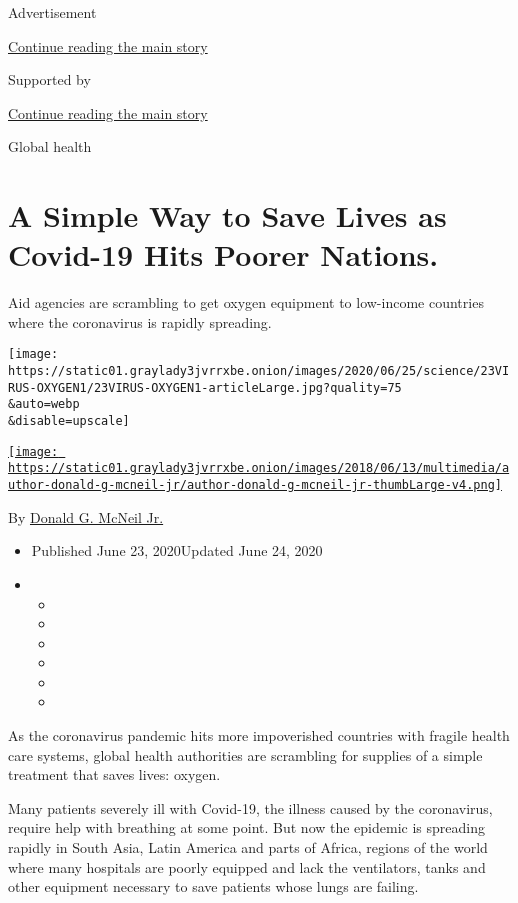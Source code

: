 Advertisement

\protect\hyperlink{after-top}{Continue reading the main story}

Supported by

\protect\hyperlink{after-sponsor}{Continue reading the main story}

Global health

\hypertarget{a-simple-way-to-save-lives-as-covid-19-hits-poorer-nations}{%
\section{A Simple Way to Save Lives as Covid-19 Hits Poorer
Nations.}\label{a-simple-way-to-save-lives-as-covid-19-hits-poorer-nations}}

Aid agencies are scrambling to get oxygen equipment to low-income
countries where the coronavirus is rapidly spreading.

\texttt{[image: https://static01.graylady3jvrrxbe.onion/images/2020/06/25/science/23VIRUS-OXYGEN1/23VIRUS-OXYGEN1-articleLarge.jpg?quality=75\\\&auto=webp\\\&disable=upscale]}

\href{https://www.nytimes3xbfgragh.onion/by/donald-g-mcneil-jr}{\texttt{[image: https://static01.graylady3jvrrxbe.onion/images/2018/06/13/multimedia/author-donald-g-mcneil-jr/author-donald-g-mcneil-jr-thumbLarge-v4.png]}}

By
\href{https://www.nytimes3xbfgragh.onion/by/donald-g-mcneil-jr}{Donald
G. McNeil Jr.}

\begin{itemize}
\item
  Published June 23, 2020Updated June 24, 2020
\item
  \begin{itemize}
  \item
  \item
  \item
  \item
  \item
  \item
  \end{itemize}
\end{itemize}

As the coronavirus pandemic hits more impoverished countries with
fragile health care systems, global health authorities are scrambling
for supplies of a simple treatment that saves lives: oxygen.

Many patients severely ill with Covid-19, the illness caused by the
coronavirus, require help with breathing at some point. But now the
epidemic is spreading rapidly in South Asia, Latin America and parts of
Africa, regions of the world where many hospitals are poorly equipped
and lack the ventilators, tanks and other equipment necessary to save
patients whose lungs are failing.

